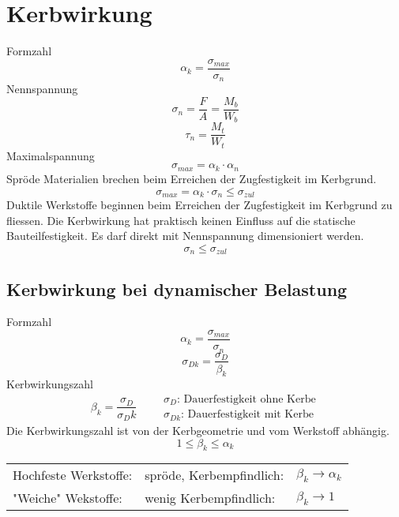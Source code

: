 



\section{Kerbwirkung}
Formzahl
\[ \alpha_k = \frac{\sigma_{max}}{\sigma_n} \]
Nennspannung
\[ \sigma_n = \frac{F}{A} = \frac{M_b}{W_b} \]
\[ \tau_n = \frac{M_t}{W_t} \]
Maximalspannung
\[ \sigma_{max} = \alpha_k \cdot \alpha_n \]
Spröde Materialien brechen beim Erreichen der Zugfestigkeit im Kerbgrund. 
\[ \sigma_{max} = \alpha_k \cdot \sigma_n \leq \sigma_{zul} \]
Duktile Werkstoffe beginnen beim Erreichen der Zugfestigkeit im Kerbgrund zu fliessen. Die Kerbwirkung hat praktisch keinen Einfluss auf die statische Bauteilfestigkeit. Es darf direkt mit Nennspannung dimensioniert werden. 
\[ \sigma_n \leq \sigma_{zul} \]

\subsection{Kerbwirkung bei dynamischer Belastung}
Formzahl
\[ \alpha_k = \frac{\sigma_{max}}{\sigma_n} \]
\[ \sigma_{Dk} = \frac{\sigma_D}{\beta_k} \]
Kerbwirkungszahl
\[ \beta_k = \frac{\sigma_D}{\sigma_Dk} \qquad \begin{matrix} \sigma_D\text{: Dauerfestigkeit ohne Kerbe}\\\sigma_{Dk}\text{: Dauerfestigkeit mit Kerbe}\end{matrix} \]
Die Kerbwirkungszahl ist von der Kerbgeometrie und vom Werkstoff abhängig. 
\[ 1 \leq \beta_k \leq \alpha_k \]
\begin{tabular}{lll}
Hochfeste Werkstoffe: &spröde, Kerbempfindlich: &$\beta_k \rightarrow \alpha_k$\\
"Weiche" Wekstoffe: &wenig Kerbempfindlich: &$\beta_k \rightarrow 1$
\end{tabular}